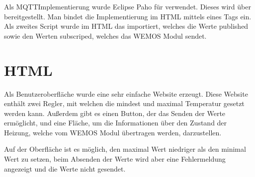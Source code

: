 \documentclass[a4paper,11pt,openany,oneside,ngerman]{sphinxmanual}
\begin{document}
Als MQTT\sphinxhyphen{}Implementierung wurde Eclipse Paho für verwendet. Dieses wird über
bereitgestellt. Man bindet die Implementierung im HTML mittels eines
\sphinxhyphen{}Tags ein. Als zweites Script wurde im HTML das  importiert,
welches die Werte published sowie den Werten subscriped, welches das WEMOS Modul
sendet.


\section{HTML}
\label{\detokenize{webpage:html}}
Als Benutzeroberfläche wurde eine sehr einfache Website erzeugt. Diese Website
enthält zwei Regler, mit welchen die mindest und maximal Temperatur gesetzt
werden kann. Außerdem gibt es einen Button, der das Senden der Werte ermöglicht,
und eine Fläche, um die Informationen über den Zustand der Heizung, welche vom
WEMOS Modul übertragen werden, darzustellen.

Auf der Oberfläche ist es möglich, den maximal Wert niedriger als den minimal
Wert zu setzen, beim Absenden der Werte wird aber eine Fehlermeldung angezeigt
und die Werte nicht gesendet.
\end{document}
